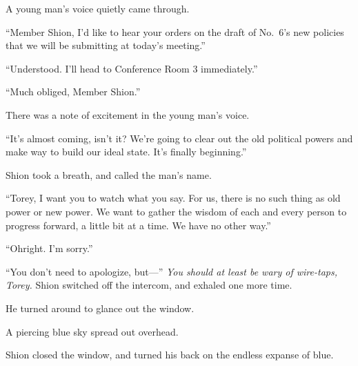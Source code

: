 A young man's voice quietly came through.

``Member Shion, I'd like to hear your orders on the draft of No.~6's new
policies that we will be submitting at today's meeting.''

``Understood. I'll head to Conference Room 3 immediately.''

``Much obliged, Member Shion.''

There was a note of excitement in the young man's voice.

``It's almost coming, isn't it? We're going to clear out the old
political powers and make way to build our ideal state. It's finally
beginning.''

Shion took a breath, and called the man's name.

``Torey, I want you to watch what you say. For us, there is no such
thing as old power or new power. We want to gather the wisdom of each
and every person to progress forward, a little bit at a time. We have no
other way.''

``Oh\el right. I'm sorry.''

``You don't need to apologize, but---'' \emph{You should at least be wary of
wire-taps, Torey.} Shion switched off the intercom, and exhaled one more
time.

He turned around to glance out the window.

A piercing blue sky spread out overhead.

Shion closed the window, and turned his back on the endless expanse of
blue.